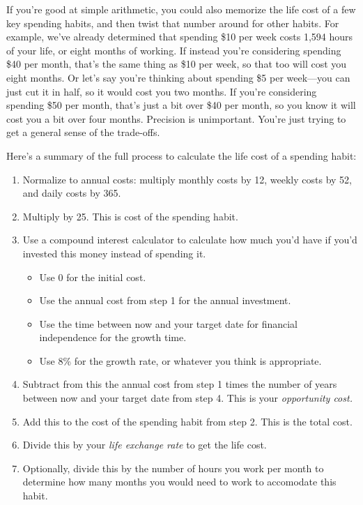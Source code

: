 If you're good at simple arithmetic, you could also memorize the life cost of a few key spending habits, and then twist that number around for other habits. For example, we've already determined that spending \$10 per week costs 1,594 hours of your life, or eight months of working. If instead you're considering spending \$40 per month, that's the same thing as \$10 per week, so that too will cost you eight months. Or let's say you're thinking about spending \$5 per week---you can just cut it in half, so it would cost you two months. If you're considering spending \$50 per month, that's just a bit over \$40 per month, so you know it will cost you a bit over four months. Precision is unimportant. You're just trying to get a general sense of the trade-offs.

Here's a summary of the full process to calculate the life cost of a spending habit:

\begin{enumerate}
\item Normalize to annual costs: multiply monthly costs by 12, weekly costs by 52, and daily costs by 365.
\item Multiply by 25. This is cost of the spending habit.
\item Use a compound interest calculator to calculate how much you'd have if you'd invested this money instead of spending it.
\begin{itemize}
\item Use 0 for the initial cost.
\item Use the annual cost from step 1 for the annual investment.
\item Use the time between now and your target date for financial independence for the growth time.
\item Use 8\% for the growth rate, or whatever you think is appropriate.
\end{itemize}
\item Subtract from this the annual cost from step 1 times the number of years between now and your target date from step 4. This is your \emph{opportunity cost.}
\item Add this to the cost of the spending habit from step 2. This is the total cost.
\item Divide this by your \emph{life exchange rate} to get the life cost.
\item Optionally, divide this by the number of hours you work per month to determine how many months you would need to work to accomodate this habit.
\end{enumerate}

